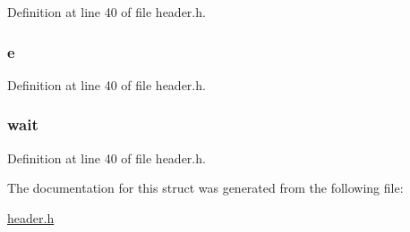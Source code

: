 Definition at line 40 of file header.\-h.

\hypertarget{structt__skill__list_aa756d3dbc91762775cff0f4b52526a70}{
\subsubsection[{e}]{ e}}\label{structt__skill__list_aa756d3dbc91762775cff0f4b52526a70}


Definition at line 40 of file header.\-h.

\hypertarget{structt__skill__list_a2a4af1a4acb8da6061990f9bd8d0a564}{
\subsubsection[{wait}]{ wait}}\label{structt__skill__list_a2a4af1a4acb8da6061990f9bd8d0a564}


Definition at line 40 of file header.\-h.



The documentation for this struct was generated from the following file\-:\begin{DoxyCompactItemize}
\item 
\hyperlink{header_8h}{header.\-h}\end{DoxyCompactItemize}
